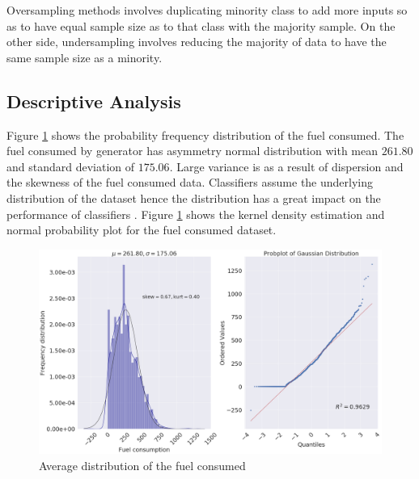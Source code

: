 \documentclass[a4paper,fleqn]{cas-dc}
\begin{document}
Oversampling methods involves duplicating minority class to add more inputs so as to have equal sample size as to that class with the majority sample. On the other side, undersampling involves reducing the majority of data to have the same sample size as a minority.

\subsection{Descriptive Analysis}

Figure \ref{fig:probitplot} shows the probability frequency distribution of the fuel consumed. The fuel consumed by generator has asymmetry normal distribution with mean $261.80$ and standard deviation of $175.06$. Large variance is as a result of dispersion and the skewness of the fuel consumed data. Classifiers assume the underlying distribution of the dataset hence the distribution has a great impact on the performance of classifiers \cite{japkowicz2011evaluating}. 
Figure \ref{fig:probitplot} shows the kernel density estimation and normal probability plot for the fuel consumed dataset. 
\begin{figure}
	\begin{minipage}[H]{\linewidth}
	\centering
	\includegraphics[width=1.0\linewidth]{Figures/probitPlot}
\end{minipage}
	\caption{Average distribution of the fuel consumed}
	\label{fig:probitplot}
\end{figure}

%
\end{document}
